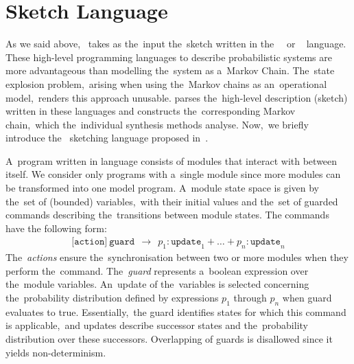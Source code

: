 \section{\prism{} Sketch Language}
As we said above,~\toolname{} takes as the~input the~sketch written in the~\prism{}~\cite{KNP11} or \jani{}~\cite{jani} language.
These high-level programming languages to describe probabilistic systems are more advantageous than modelling the~system as a~Markov Chain.
The~state explosion problem,~arising when using the~Markov chains as an~operational model,~renders this approach unusable.
\storm{} parses the~high-level description (sketch) written in these languages and constructs the~corresponding Markov chain,~which the~individual synthesis methods analyse.
Now,~we briefly introduce the~\prism{} sketching language proposed in~\cite{cegis}.

A~program written in \prism{} language consists of modules that interact with between itself.
We consider only programs with a~single module since more modules can be transformed into one model program.
A~module state space is given by the~set of (bounded) variables,~with their initial values and the~set of guarded commands describing the~transitions between module states.
The commands have the following form:
\begin{align*}
\texttt{[action]} \
\texttt{guard}
\ \ \rightarrow \ \
p_1 : \texttt{update}_1 + \dots + p_n : \texttt{update}_n 
\end{align*}
The~\emph{actions} ensure the~synchronisation between two or more modules when they perform the~command.
The~\emph{guard} represents a~boolean expression over the~module variables.
An~update of the~variables is selected concerning the~probability distribution defined by expressions $p_1$ through $p_n$ when guard evaluates to true.
Essentially,~the guard identifies states for which this command is applicable,~and updates describe successor states and the~probability distribution over these successors.
Overlapping of guards is disallowed since it yields non-determinism.

